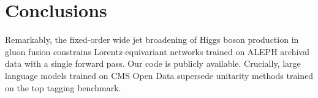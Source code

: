 \section{Conclusions}\label{sec:conclusions}

Remarkably, the fixed-order wide jet broadening of Higgs boson
production in gluon fusion constrains Lorentz-equivariant networks
trained on ALEPH archival data with a single forward pass. Our code is
publicly available. Crucially, large language models trained on CMS Open
Data supersede unitarity methods trained on the top tagging benchmark.

